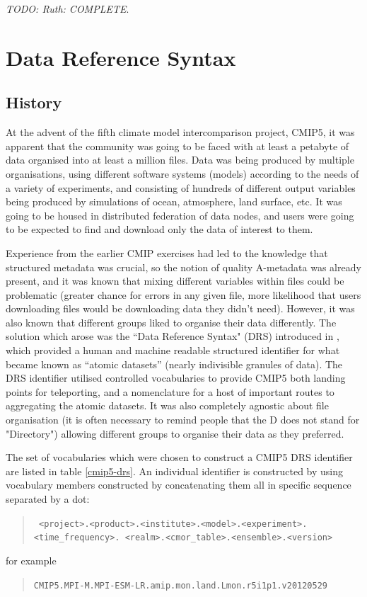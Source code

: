 \documentclass[final,1p,times,twocolumn,authoryear]{elsarticle}
\begin{document}
\textit{TODO: Ruth: COMPLETE}.
 
\section{Data Reference Syntax}
\subsection{History}
\label{s:history}

At the advent of the fifth climate model intercomparison project, CMIP5, it was apparent that the community was going to be faced with at least a petabyte of data organised into at least a million files. 
Data was being produced by multiple organisations, using different software systems (models) according to the needs of a variety of experiments, and consisting of hundreds of different output variables being produced by simulations of ocean, atmosphere, land surface, etc.  
It was going to be housed in distributed federation of data nodes, and users were going to be expected to find and download only the data of interest to them.

Experience from the earlier CMIP exercises had led to the knowledge that structured metadata was crucial, so the notion of quality A-metadata was already present, and it was known that mixing different variables within files could be problematic (greater chance for errors in any given file, more likelihood that users downloading files would be downloading data they didn't need). 
However, it was also known that different groups liked to organise their data differently. 
The solution which arose was the ``Data Reference Syntax" (DRS) introduced in \cite{TayEA12}, which provided a human and machine readable structured identifier for what became known as ``atomic datasets'' (nearly indivisible granules of data). 
The DRS identifier utilised controlled vocabularies to provide CMIP5 both landing points for teleporting, and a nomenclature for a host of important routes to aggregating the atomic datasets.  
It was also completely agnostic about file organisation (it is often necessary to remind people that the D does not stand for "Directory") allowing different groups to organise their data as they preferred.

The set of vocabularies which were chosen to construct a CMIP5 DRS identifier are listed in table \ref{cmip5-drs}.
An individual identifier is constructed by using vocabulary members constructed by concatenating them all in specific sequence separated by a dot: 
\begin{quote}
\small\texttt{
\textless{}project\textgreater{}.\textless{}product\textgreater{}.\textless{}institute\textgreater{}.\textless{}model\textgreater{}.\textless{}experiment\textgreater{}.\textless{}time\_frequency\textgreater{}.\newline
\textless{}realm\textgreater{}.\textless{}cmor\_table\textgreater{}.\textless{}ensemble\textgreater{}.\textless{}version\textgreater{}}
\end{quote}
for example
\begin{quote}
 \small\texttt{CMIP5.MPI-M.MPI-ESM-LR.amip.mon.land.Lmon.r5i1p1.v20120529}
 \end{quote}
\end{document}

